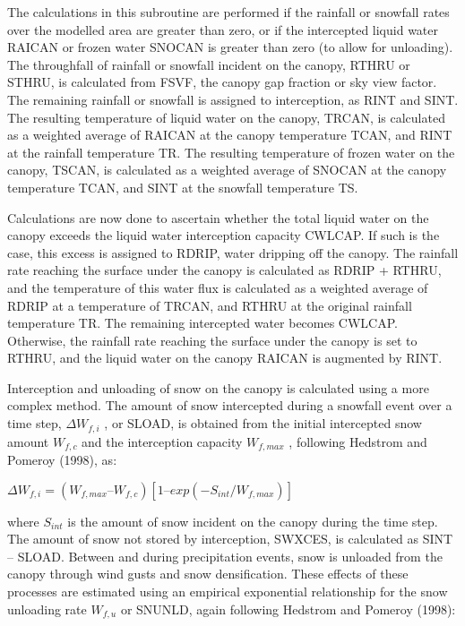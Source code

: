 The calculations in this subroutine are performed if the rainfall or snowfall rates over the modelled area are greater than zero, or if the intercepted liquid water R\+A\+I\+C\+A\+N or frozen water S\+N\+O\+C\+A\+N is greater than zero (to allow for unloading). The throughfall of rainfall or snowfall incident on the canopy, R\+T\+H\+R\+U or S\+T\+H\+R\+U, is calculated from F\+S\+V\+F, the canopy gap fraction or sky view factor. The remaining rainfall or snowfall is assigned to interception, as R\+I\+N\+T and S\+I\+N\+T. The resulting temperature of liquid water on the canopy, T\+R\+C\+A\+N, is calculated as a weighted average of R\+A\+I\+C\+A\+N at the canopy temperature T\+C\+A\+N, and R\+I\+N\+T at the rainfall temperature T\+R. The resulting temperature of frozen water on the canopy, T\+S\+C\+A\+N, is calculated as a weighted average of S\+N\+O\+C\+A\+N at the canopy temperature T\+C\+A\+N, and S\+I\+N\+T at the snowfall temperature T\+S.

Calculations are now done to ascertain whether the total liquid water on the canopy exceeds the liquid water interception capacity C\+W\+L\+C\+A\+P. If such is the case, this excess is assigned to R\+D\+R\+I\+P, water dripping off the canopy. The rainfall rate reaching the surface under the canopy is calculated as R\+D\+R\+I\+P + R\+T\+H\+R\+U, and the temperature of this water flux is calculated as a weighted average of R\+D\+R\+I\+P at a temperature of T\+R\+C\+A\+N, and R\+T\+H\+R\+U at the original rainfall temperature T\+R. The remaining intercepted water becomes C\+W\+L\+C\+A\+P. Otherwise, the rainfall rate reaching the surface under the canopy is set to R\+T\+H\+R\+U, and the liquid water on the canopy R\+A\+I\+C\+A\+N is augmented by R\+I\+N\+T.

Interception and unloading of snow on the canopy is calculated using a more complex method. The amount of snow intercepted during a snowfall event over a time step, $\Delta W_{f,i}$ , or S\+L\+O\+A\+D, is obtained from the initial intercepted snow amount $W_{f,c}$ and the interception capacity $W_{f,max}$ , following Hedstrom and Pomeroy (1998), as\+:

$\Delta W_{f,i} = (W_{f,max} – W_{f,c} ) [1 – exp(-S_{int} /W_{f,max} )]$

where $S_{int}$ is the amount of snow incident on the canopy during the time step. The amount of snow not stored by interception, S\+W\+X\+C\+E\+S, is calculated as S\+I\+N\+T – S\+L\+O\+A\+D. Between and during precipitation events, snow is unloaded from the canopy through wind gusts and snow densification. These effects of these processes are estimated using an empirical exponential relationship for the snow unloading rate $W_{f,u}$ or S\+N\+U\+N\+L\+D, again following Hedstrom and Pomeroy (1998)\+:


